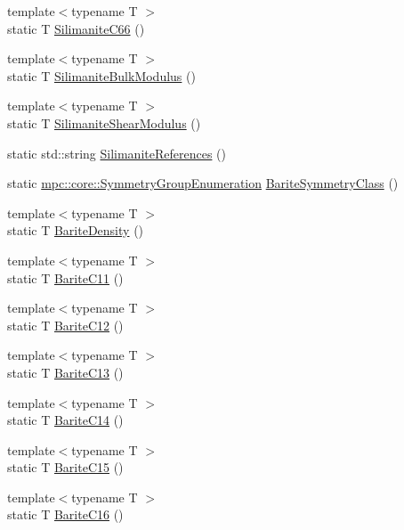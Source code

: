 \begin{DoxyCompactItemize}
{\footnotesize template$<$typename T $>$ }\\static T \mbox{\hyperlink{namespacempc_1_1data_a52d86be964f64f96ca7d72ea9d158c5a}{Silimanite\+C66}} ()
\item 
{\footnotesize template$<$typename T $>$ }\\static T \mbox{\hyperlink{namespacempc_1_1data_a64569698c17a0ac4e1bb5a26ef380d6c}{Silimanite\+Bulk\+Modulus}} ()
\item 
{\footnotesize template$<$typename T $>$ }\\static T \mbox{\hyperlink{namespacempc_1_1data_a1166a34cdb032fb9cd3b1125ddcd3f2a}{Silimanite\+Shear\+Modulus}} ()
\item 
static std\+::string \mbox{\hyperlink{namespacempc_1_1data_a9aa0d41289dbb515bb72e1887c096e60}{Silimanite\+References}} ()
\item 
static \mbox{\hyperlink{namespacempc_1_1core_a9d979684062547055a0ef5c13077bad8}{mpc\+::core\+::\+Symmetry\+Group\+Enumeration}} \mbox{\hyperlink{namespacempc_1_1data_ae9501fd6b7747a04f6af41111a43274c}{Barite\+Symmetry\+Class}} ()
\item 
{\footnotesize template$<$typename T $>$ }\\static T \mbox{\hyperlink{namespacempc_1_1data_ae5d92870bf347bdc2f05d7c81ea23adb}{Barite\+Density}} ()
\item 
{\footnotesize template$<$typename T $>$ }\\static T \mbox{\hyperlink{namespacempc_1_1data_aa2986523c8f0c5725449479052670e04}{Barite\+C11}} ()
\item 
{\footnotesize template$<$typename T $>$ }\\static T \mbox{\hyperlink{namespacempc_1_1data_a8f1a01d1c3396daa81a125bcfb8bae66}{Barite\+C12}} ()
\item 
{\footnotesize template$<$typename T $>$ }\\static T \mbox{\hyperlink{namespacempc_1_1data_aa7158eb57a531fa0a4e5a465551f8953}{Barite\+C13}} ()
\item 
{\footnotesize template$<$typename T $>$ }\\static T \mbox{\hyperlink{namespacempc_1_1data_a2677f52e6f490051560d9b3db115c402}{Barite\+C14}} ()
\item 
{\footnotesize template$<$typename T $>$ }\\static T \mbox{\hyperlink{namespacempc_1_1data_aaa19b9ed6cfd15ed7aacbc66263e6b62}{Barite\+C15}} ()
\item 
{\footnotesize template$<$typename T $>$ }\\static T \mbox{\hyperlink{namespacempc_1_1data_a218a39c4d6b9a9a0fccfafbf877392f5}{Barite\+C16}} ()

\end{DoxyCompactItemize}
